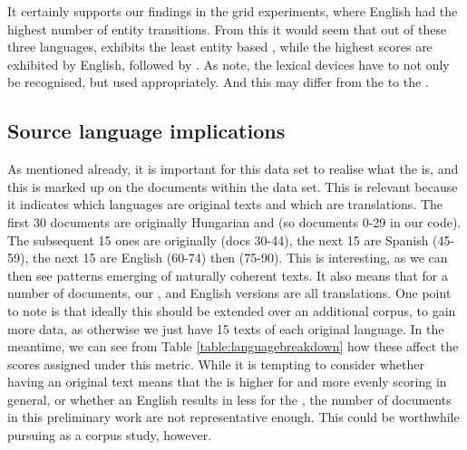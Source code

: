 \documentclass[output=paper]{langsci/langscibook.cls}
\begin{document}
It certainly supports our findings in the grid experiments, where English had the highest number of entity transitions.
From this it would seem that out of these three languages,  exhibits the least entity based , while the highest scores are exhibited by English, followed by . 
As \citet{WongKit} note, the lexical  devices have to not only be recognised, but used appropriately. And this may differ from the  to the . 

\subsection{Source language implications}
As mentioned already, it is important for this data set to realise what the  is, and this is marked up on the documents within the  data set. This is relevant because it indicates which languages are original texts and which are translations. The first 30 documents are originally Hungarian and  (so documents 0-29 in our code). The subsequent 15 ones are originally  (docs 30-44), the next 15 are Spanish (45-59), the next 15 are English (60-74) then  (75-90). This is interesting, as we can then see patterns emerging of naturally coherent texts. It also means that for a number of documents, our ,  and English versions are all translations. One point to note is that ideally this should be extended over an additional corpus, to gain more data, as otherwise we just have 15 texts of each original language. In the meantime, we can see from Table \ref{table:languagebreakdown} how these affect the scores assigned under this metric. While it is tempting to consider whether 
having an original  text means that the  is higher for  and more evenly scoring in general, or whether an English  results in less  for the , the number of documents in this preliminary work are not representative enough. This could be worthwhile pursuing as a corpus study, however.


\begin{table}
\caption{\label{table:languagebreakdown}Breakdown of highest scoring documents}
\end{table}
\end{document}
